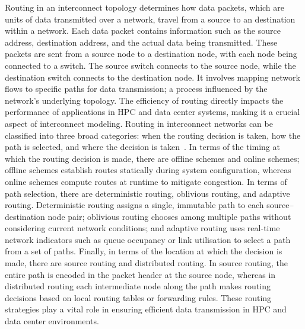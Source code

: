 Routing in an interconnect topology determines how data packets, which are units of data transmitted over a network, travel from a source to an destination within a network. Each data packet contains information such as the source address, destination address, and the actual data being transmitted. These packets are sent from a source node to a destination node, with each node being connected to a switch. The source switch connects to the source node, while the destination switch connects to the destination node. It involves mapping network flows to specific paths for data transmission; a process influenced by the network's underlying topology. The efficiency of routing directly impacts the performance of applications in HPC and data center systems, making it a crucial aspect of interconnect modeling.
Routing in interconnect networks can be classified into three broad categories: when the routing decision is taken, how the path is selected, and where the decision is taken~\cite{scheideler2006universal, dally2004principles}. In terms of the timing at which the routing decision is made, there are offline schemes and online schemes; offline schemes establish routes statically during system configuration, whereas online schemes compute routes at runtime to mitigate congestion. In terms of path selection, there are deterministic routing, oblivious routing, and adaptive routing. Deterministic routing assigns a single, immutable path to each source–destination node pair; oblivious routing chooses among multiple paths without considering current network conditions; and adaptive routing uses real-time network indicators such as queue occupancy or link utilisation to select a path from a set of paths. Finally, in terms of the location at which the decision is made, there are source routing and distributed routing. In source routing, the entire path is encoded in the packet header at the source node, whereas in distributed routing each intermediate node along the path makes routing decisions based on local routing tables or forwarding rules.
These routing strategies play a vital role in ensuring efficient data transmission in HPC and data center environments.

